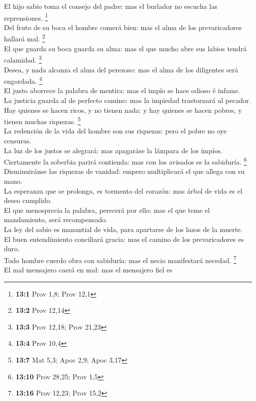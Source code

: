  El hijo sabio toma el consejo del padre: mas el burlador no
escucha las reprensiones. \footnote{\textbf{13:1} Prov 1,8; Prov 12,1}\\
 Del fruto de su boca el hombre comerá bien: mas el alma de
los prevaricadores hallará mal. \footnote{\textbf{13:2} Prov 12,14}\\
 El que guarda su boca guarda su alma: mas el que mucho abre
sus labios tendrá calamidad. \footnote{\textbf{13:3} Prov 12,18; Prov
  21,23}\\
 Desea, y nada alcanza el alma del perezoso: mas el alma de
los diligentes será engordada. \footnote{\textbf{13:4} Prov 10,4}\\
 El justo aborrece la palabra de mentira: mas el impío se
hace odioso é infame.\\
 La justicia guarda al de perfecto camino: mas la impiedad
trastornará al pecador.\\
 Hay quienes se hacen ricos, y no tienen nada: y hay quienes
se hacen pobres, y tienen muchas riquezas. \footnote{\textbf{13:7} Mat
  5,3; Apoc 2,9; Apoc 3,17}\\
 La redención de la vida del hombre son sus riquezas: pero
el pobre no oye censuras.\\
 La luz de los justos se alegrará: mas apagaráse la lámpara
de los impíos.\\
 Ciertamente la soberbia parirá contienda: mas con los
avisados es la sabiduría. \footnote{\textbf{13:10} Prov 28,25; Prov 1,5}\\
 Disminuiránse las riquezas de vanidad: empero multiplicará
el que allega con su mano.\\
 La esperanza que se prolonga, es tormento del corazón: mas
árbol de vida es el deseo cumplido.\\
 El que menosprecia la palabra, perecerá por ello: mas el
que teme el mandamiento, será recompensado.\\
 La ley del sabio es manantial de vida, para apartarse de
los lazos de la muerte.\\
 El buen entendimiento conciliará gracia: mas el camino de
los prevaricadores es duro.\\
 Todo hombre cuerdo obra con sabiduría: mas el necio
manifestará necedad. \footnote{\textbf{13:16} Prov 12,23; Prov 15,2}\\
 El mal mensajero caerá en mal: mas el mensajero fiel es
